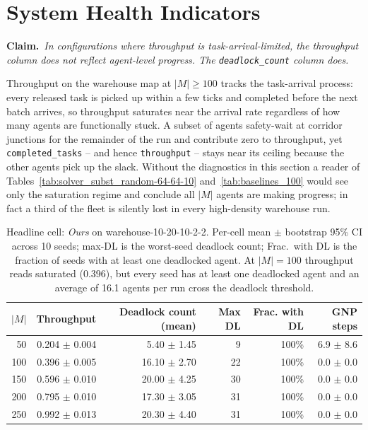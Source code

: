 %

\section{System Health Indicators}
\label{sec:system_health}

\noindent\textbf{Claim.}\ \emph{In configurations where throughput is
task-arrival-limited, the throughput column does not reflect
agent-level progress.  The \texttt{deadlock\_count} column does.}

\medskip

Throughput on the warehouse map at $|M| \ge 100$ tracks the
task-arrival process: every released task is picked up within a few
ticks and completed before the next batch arrives, so throughput
saturates near the arrival rate regardless of how many agents are
functionally stuck.  A subset of agents safety-wait at corridor
junctions for the remainder of the run and contribute zero to
throughput, yet \texttt{completed\_tasks} -- and hence
\texttt{throughput} -- stays near its ceiling because the other
agents pick up the slack.  Without the diagnostics in this section a
reader of Tables~\ref{tab:solver_subst_random-64-64-10}
and~\ref{tab:baselines_100} would see only the saturation regime and
conclude all $|M|$ agents are making progress; in fact a third of
the fleet is silently lost in every high-density warehouse run.

\begin{table}[t]
\centering
\small
\begin{tabular}{rrrrrr}
\toprule
$|M|$ & Throughput & Deadlock count (mean) & Max DL & Frac. with DL & GNP steps \\
\midrule
  50 & 0.204 $\pm$ 0.004 &  5.40 $\pm$ 1.45 &  9 & 100\% &  6.9 $\pm$ 8.6 \\
 100 & 0.396 $\pm$ 0.005 & 16.10 $\pm$ 2.70 & 22 & 100\% &  0.0 $\pm$ 0.0 \\
 150 & 0.596 $\pm$ 0.010 & 20.00 $\pm$ 4.25 & 30 & 100\% &  0.0 $\pm$ 0.0 \\
 200 & 0.795 $\pm$ 0.010 & 17.30 $\pm$ 3.05 & 31 & 100\% &  0.0 $\pm$ 0.0 \\
 250 & 0.992 $\pm$ 0.013 & 20.30 $\pm$ 4.40 & 31 & 100\% &  0.0 $\pm$ 0.0 \\
\bottomrule
\end{tabular}
\caption{Headline cell: \emph{Ours} on warehouse-10-20-10-2-2.
Per-cell mean $\pm$ bootstrap 95\% CI across 10 seeds; max-DL is the
worst-seed deadlock count; Frac.\ with DL is the fraction of seeds
with at least one deadlocked agent.  At $|M|=100$ throughput reads
saturated (0.396), but every seed has at least one deadlocked agent
and an average of 16.1 agents per run cross the deadlock threshold.}
\label{tab:system_health_headline}
\end{table}

